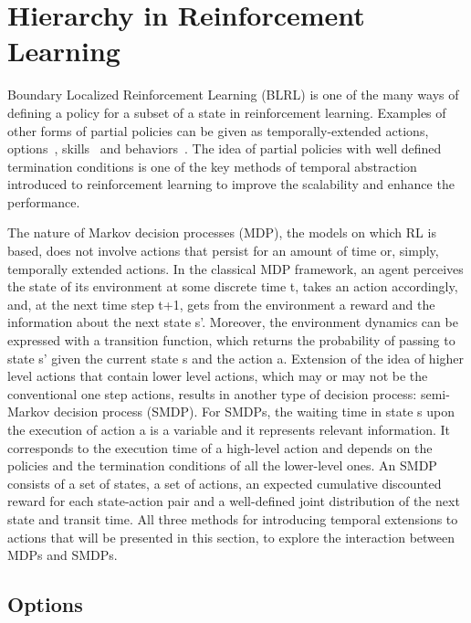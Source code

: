 \section{Hierarchy in Reinforcement Learning}

Boundary  Localized  Reinforcement Learning (BLRL) is one of the many ways of defining a policy for a subset of a state in reinforcement learning. Examples of other forms of partial policies can be given as temporally-extended actions, options~\cite{Sutton1999BetweenMA}, skills~\cite{Thrun1994FindingSI} and behaviors~\cite{Brooksbehaviors, Huber1997AFC}. The idea of partial policies with well defined termination conditions is one of the key methods of temporal abstraction introduced to reinforcement learning to improve the scalability and enhance the performance. 

The nature of Markov decision processes (MDP), the models on which RL is based, does not involve actions that persist for an amount of time or, simply, temporally extended actions. In the classical MDP framework, an agent perceives the state of its environment at some discrete time t, takes an action accordingly, and, at the next time step t+1, gets from the environment a reward and the information about the next state s'. Moreover, the environment dynamics can be expressed with a transition function, which returns the probability of passing to state s’ given the current state s and the action a. Extension of the idea of higher level actions that contain lower level actions, which may or may not be the conventional one step actions, results in another type of decision process: semi-Markov decision process (SMDP). For SMDPs, the waiting time in state s upon the execution of action a is a variable and it represents relevant information. It corresponds to the execution time of a high-level action and depends on the policies and the termination conditions of all the lower-level ones. An SMDP consists of a set of states, a set of actions, an expected cumulative discounted reward for each state-action pair and a well-defined joint distribution of the next state and transit time. All three methods for introducing temporal extensions to actions that will be presented in this section, to explore the interaction between MDPs and SMDPs.

\subsection{Options}

